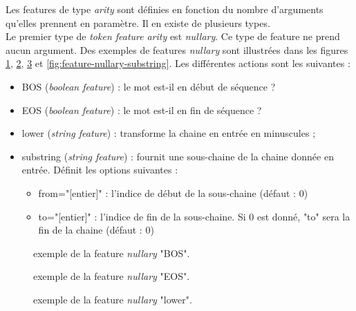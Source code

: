 \documentclass[manual-fr.tex]{subfiles}
\begin{document}
Les features de type \textit{arity} sont définies en fonction du nombre d'arguments qu'elles prennent en paramètre. Il en existe de plusieurs types.\\

Le premier type de \textit{token feature} \textit{arity} est \textit{nullary}. Ce type de feature ne prend aucun argument. Des exemples de features \textit{nullary} sont illustrées dans les figures \ref{fig:feature-nullary-BOS}, \ref{fig:feature-nullary-EOS}, \ref{fig:feature-nullary-lower} et \ref{fig:feature-nullary-substring}. Les différentes actions sont les suivantes :
\begin{itemize}
    \item BOS (\textit{boolean feature}) : le mot est-il en début de séquence ?
    \item EOS (\textit{boolean feature}) : le mot est-il en fin de séquence ?
    \item lower (\textit{string feature}) : transforme la chaine en entrée en minuscules ;
    \item substring (\textit{string feature}) : fournit une sous-chaine de la chaine donnée en entrée. Définit les options suivantes :
    \begin{itemize}
        \item from="[entier]" : l'indice de début de la sous-chaine (défaut : 0)
        \item to="[entier]" : l'indice de fin de la sous-chaine. Si 0 est donné, "to" sera la fin de la chaine (défaut : 0)
    \end{itemize}
\end{itemize}

\begin{figure}[ht!]
\footnotesize
\begin{xml}
\end{xml}
\caption{exemple de la feature \textit{nullary} "BOS".}
\label{fig:feature-nullary-BOS}
\end{figure}

\begin{figure}[ht!]
\footnotesize
\begin{xml}
\end{xml}
\caption{exemple de la feature \textit{nullary} "EOS".}
\label{fig:feature-nullary-EOS}
\end{figure}

\begin{figure}[ht!]
\footnotesize
\begin{xml}
\end{xml}
\caption{exemple de la feature \textit{nullary} "lower".}
\label{fig:feature-nullary-lower}
\end{figure}
\end{document}
